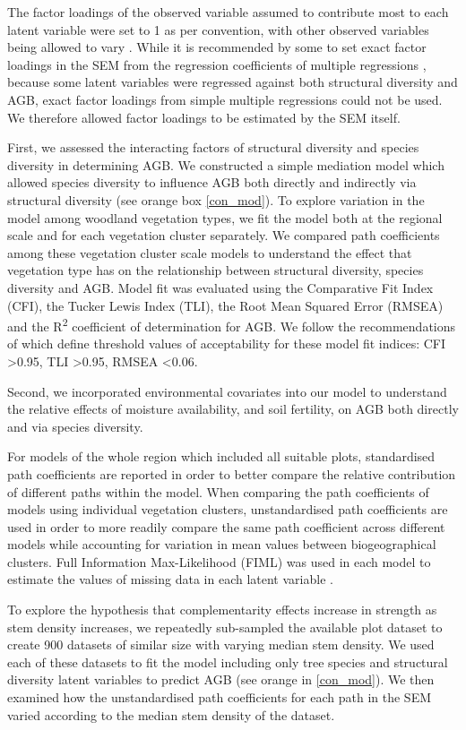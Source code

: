 \documentclass[11pt,a4paper]{article}
\begin{document}
The factor loadings of the observed variable assumed to contribute most to each latent variable were set to 1 as per convention, with other observed variables being allowed to vary \citep{}. While it is recommended by some to set exact factor loadings in the SEM from the regression coefficients of multiple regressions \citep{}, because some latent variables were regressed against both structural diversity and AGB, exact factor loadings from simple multiple regressions could not be used. We therefore allowed factor loadings to be estimated by the SEM itself.

First, we assessed the interacting factors of structural diversity and species diversity in determining AGB. We constructed a simple mediation model which allowed species diversity to influence AGB both directly and indirectly via structural diversity (see orange box \autoref{con_mod}). To explore variation in the model among woodland vegetation types, we fit the model both at the regional scale and for each vegetation cluster separately. We compared path coefficients among these vegetation cluster scale models to understand the effect that vegetation type has on the relationship between structural diversity, species diversity and AGB. Model fit was evaluated using the Comparative Fit Index (CFI), the Tucker Lewis Index (TLI), the Root Mean Squared Error (RMSEA) and the R\textsuperscript{2} coefficient of determination for AGB. We follow the recommendations of \citet{Hu1999} which define threshold values of acceptability for these model fit indices: CFI >0.95, TLI >0.95, RMSEA <0.06.

Second, we incorporated environmental covariates into our model to understand the relative effects of moisture availability, and soil fertility, on AGB both directly and via species diversity. 

For models of the whole region which included all suitable plots, standardised path coefficients are reported in order to better compare the relative contribution of different paths within the model. When comparing the path coefficients of models using individual vegetation clusters, unstandardised path coefficients are used in order to more readily compare the same path coefficient across different models while accounting for variation in mean values between biogeographical clusters. Full Information Max-Likelihood (FIML) was used in each model to estimate the values of missing data in each latent variable \citep{Kline2005}.

To explore the hypothesis that complementarity effects increase in strength as stem density increases, we repeatedly sub-sampled the available plot dataset to create 900 datasets of similar size with varying median stem density. We used each of these datasets to fit the model including only tree species and structural diversity latent variables to predict AGB (see orange in \autoref{con_mod}). We then examined how the unstandardised path coefficients for each path in the SEM varied according to the median stem density of the dataset.
\end{document}
